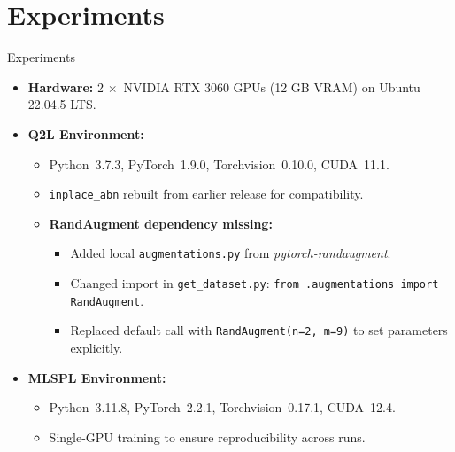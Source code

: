 \section{Experiments}


\begin{frame}{Experiments}
  \begin{itemize}
  \item \textbf{Hardware:} 2$\,\times$ NVIDIA RTX 3060 GPUs (12 GB VRAM) on Ubuntu 22.04.5 LTS.

  \item \textbf{Q2L Environment:}
    \begin{itemize}
      \item Python~3.7.3, PyTorch~1.9.0, Torchvision~0.10.0, CUDA~11.1.
      \item \texttt{inplace\_abn} rebuilt from earlier release for compatibility.
      \item \textbf{RandAugment dependency missing:}
        \begin{itemize}
          \item Added local \texttt{augmentations.py} from \textit{pytorch-randaugment}.
          \item Changed import in \texttt{get\_dataset.py}: \texttt{from .augmentations import RandAugment}.
          \item Replaced default call with \texttt{RandAugment(n=2, m=9)} to set parameters explicitly.
        \end{itemize}
    \end{itemize}

  \item \textbf{MLSPL Environment:}
    \begin{itemize}
      \item Python~3.11.8, PyTorch~2.2.1, Torchvision~0.17.1, CUDA~12.4.
      \item Single-GPU training to ensure reproducibility across runs.
    \end{itemize}
\end{itemize}
\end{frame}

